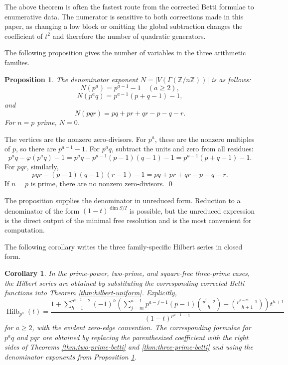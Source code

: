 \documentclass[12pt]{article}
\newtheorem{proposition}[theorem]{Proposition}
\newtheorem{corollary}[theorem]{Corollary}
\theoremstyle{definition}
\renewenvironment{proof}{{\bf \noindent Proof.}}{\qed}
\begin{document}
The above theorem is often the fastest route from the corrected Betti formulae to enumerative data.  The numerator is sensitive to both corrections made in this paper, as changing a low block or omitting the global subtraction changes the coefficient of $t^2$ and therefore the number of quadratic generators.

\medskip

\noindent The following proposition gives the number of variables in the three arithmetic families.
\begin{proposition}\label{prop:vertex-counts}
The denominator exponent $N=|V(\Gamma(\mathbb{Z}/n\mathbb{Z}))|$ is as follows:
$$
N(p^a)=p^{a-1}-1\quad (a\geq 2),
$$
$$
N(p^a q)=p^{a-1}(p+q-1)-1,
$$
and
$$
N(pqr)=pq+pr+qr-p-q-r.
$$
For $n=p$ prime, $N=0$.
\end{proposition}

\begin{proof}
The vertices are the nonzero zero-divisors.  For $p^a$, these are the nonzero multiples of $p$, so there are $p^{a-1}-1$.  For $p^a q$, subtract the units and zero from all residues:
$$
p^a q-\varphi(p^a q)-1=p^a q-p^{a-1}(p-1)(q-1)-1=p^{a-1}(p+q-1)-1.
$$
For $pqr$, similarly,
$$
pqr-(p-1)(q-1)(r-1)-1=pq+pr+qr-p-q-r.
$$
If $n=p$ is prime, there are no nonzero zero-divisors.
\end{proof}

\medskip

The proposition supplies the denominator in unreduced form.  Reduction to a denominator of the form $(1-t)^{\dim S/I}$ is possible, but the unreduced expression is the direct output of the minimal free resolution and is the most convenient for computation.

\medskip

\noindent The following corollary writes the three family-specific Hilbert series in closed form.
\begin{corollary}\label{cor:family-hilbert}
In the prime-power, two-prime, and square-free three-prime cases, the Hilbert series are obtained by substituting the corresponding corrected Betti functions into Theorem \ref{thm:hilbert-uniform}.  Explicitly,
$$
\operatorname{Hilb}_{p^a}(t)=\frac{1+\sum_{h=1}^{p^{a-1}-2}(-1)^h\left(\sum_{j=m}^{a-1}p^{a-j-1}(p-1)\binom{p^j-2}{h}-\binom{p^{a-m}-1}{h+1}\right)t^{h+1}}{(1-t)^{p^{a-1}-1}}
$$
for $a\geq 2$, with the evident zero-edge convention.  The corresponding formulae for $p^a q$ and $pqr$ are obtained by replacing the parenthesized coefficient with the right sides of Theorems \ref{thm:two-prime-betti} and \ref{thm:three-prime-betti} and using the denominator exponents from Proposition \ref{prop:vertex-counts}.
\end{corollary}
\end{document}
